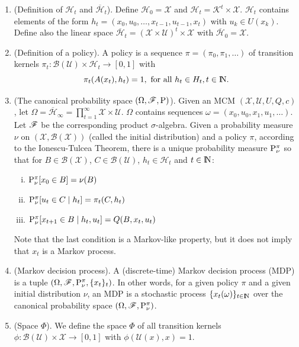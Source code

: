 \documentclass[a4paper,10pt]{article}
\begin{document}
\begin{enumerate}
 \item (Definition of $\mathcal{H}_t$ and $\overline{\mathcal{H}}_t$). Define $\mathcal{H}_0=\mathcal{X}$ and $\mathcal{H}_t = \mathcal{K}^t\times \mathcal{X}$.
       $\mathcal{H}_t$ contains elements of the form $h_t = (x_0,u_0,\ldots,x_{t-1}, u_{t-1}, x_t)$ with $u_k\in U(x_k)$.
       Define also the linear space $\overline{\mathcal{H}}_t = (\mathcal{X}\times \mathcal{U})^{t}\times \mathcal{X}$ with $\overline{\mathcal{H}}_0=\mathcal{X}$.
 \item (Definition of a policy). A policy is a sequence $\pi=(\pi_0,\pi_1,\ldots)$ of transition kernels $\pi_t:\mathcal{B}(\mathcal{U})\times \mathcal{H}_t\to [0,1]$ with 
	\[
	  \pi_t(A(x_t), h_t) = 1,\text{ for all } h_t\in H_t, t\in\N.
	\]
 \item (The canonical probability space $(\Omega,\mathscr{F},\mathrm{P})$). Given an MCM \(\left(\mathcal{X},\mathcal{U}, U, Q, c\right)\), let $\Omega=\overline{\mathcal{H}}_{\infty} = \prod_{t=1}^{\infty}\mathcal{X}\times\mathcal{U}$. 
       $\Omega$ contains sequences $\omega = (x_0,u_0,x_1,u_1,\ldots)$.
       Let $\mathscr{F}$ be the corresponding product $\sigma$-algebra. Given a probability measure $\nu$ on $(\mathcal{X}, \mathcal{B}(\mathcal{X}))$ (called the initial
       distribution) and a policy $\pi$, according to the Ionescu-Tulcea Theorem, there is a unique probability measure $\mathrm{P}_\nu^\pi$ so that
       for $B\in\mathcal{B}(\mathcal{X})$, $C\in\mathcal{B}(\mathcal{U})$, $h_t\in\mathcal{H}_t$ and $t\in\N$:
       \begin{enumerate}[i.]
        \item $\mathrm{P}_\nu^\pi[x_0\in B] = \nu(B)$
        \item $\mathrm{P}_\nu^\pi[u_t\in C\mid h_t] = \pi_t(C, h_t)$
        \item $\mathrm{P}_\nu^\pi[x_{t+1}\in B\mid h_t, u_t] = Q(B, x_t, u_t)$
       \end{enumerate}
       Note that the last condition is a Markov-like property, but it does not imply that $x_t$ is a Markov process.

 \item (Markov decision process). A (discrete-time) Markov decision process (MDP) is a tuple $(\Omega, \mathscr{F}, \mathrm{P}_{\nu}^{\pi}, \{x_t\}_t)$. In other words, 
       for a given policy $\pi$ and a given initial distribution $\nu$, an MDP is a stochastic process $\{x_t(\omega)\}_{t\in\N}$ over the 
       canonical probability space $(\Omega, \mathscr{F}, \mathrm{P}_{\nu}^{\pi})$.
       
 \item (Space $\Phi$). We define the space $\Phi$ of all transition kernels $\phi:\mathcal{B}(\mathcal{U})\times \mathcal{X}\to [0,1]$ with 
       $\phi(\mathcal{U}(x), x)=1$.
       

\end{enumerate}
\end{document}
